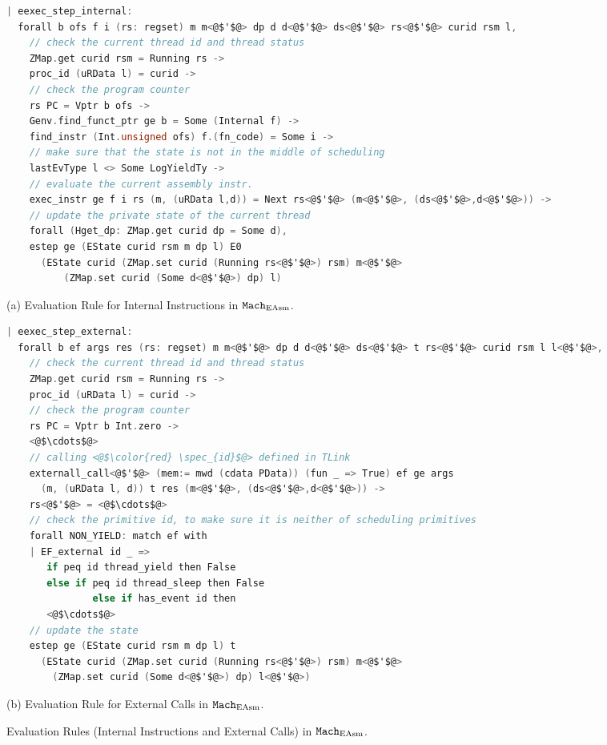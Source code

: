\begin{figure}
\begin{lstlisting}[language=C, deletekeywords={unsigned}]
| eexec_step_internal:
  forall b ofs f i (rs: regset) m m<@$'$@> dp d d<@$'$@> ds<@$'$@> rs<@$'$@> curid rsm l,
    // check the current thread id and thread status
    ZMap.get curid rsm = Running rs ->
    proc_id (uRData l) = curid ->
    // check the program counter
    rs PC = Vptr b ofs ->
    Genv.find_funct_ptr ge b = Some (Internal f) ->
    find_instr (Int.unsigned ofs) f.(fn_code) = Some i ->
    // make sure that the state is not in the middle of scheduling
    lastEvType l <> Some LogYieldTy ->
    // evaluate the current assembly instr.
    exec_instr ge f i rs (m, (uRData l,d)) = Next rs<@$'$@> (m<@$'$@>, (ds<@$'$@>,d<@$'$@>)) ->
    // update the private state of the current thread
    forall (Hget_dp: ZMap.get curid dp = Some d),
    estep ge (EState curid rsm m dp l) E0
      (EState curid (ZMap.set curid (Running rs<@$'$@>) rsm) m<@$'$@> 
          (ZMap.set curid (Some d<@$'$@>) dp) l)
\end{lstlisting}
\begin{center}
(a) Evaluation Rule for Internal Instructions in ${\mathrm{\texttt{Mach}}}_{\mathrm{EAsm}}$.
\end{center}
\begin{lstlisting}[language=C]
| eexec_step_external:
  forall b ef args res (rs: regset) m m<@$'$@> dp d d<@$'$@> ds<@$'$@> t rs<@$'$@> curid rsm l l<@$'$@>,
    // check the current thread id and thread status  
    ZMap.get curid rsm = Running rs ->
    proc_id (uRData l) = curid ->
    // check the program counter
    rs PC = Vptr b Int.zero ->
    <@$\cdots$@>
    // calling <@$\color{red} \spec_{id}$@> defined in TLink
    externall_call<@$'$@> (mem:= mwd (cdata PData)) (fun _ => True) ef ge args 
      (m, (uRData l, d)) t res (m<@$'$@>, (ds<@$'$@>,d<@$'$@>)) ->
    rs<@$'$@> = <@$\cdots$@>
    // check the primitive id, to make sure it is neither of scheduling primitives
    forall NON_YIELD: match ef with
    | EF_external id _ => 
       if peq id thread_yield then False
       else if peq id thread_sleep then False
               else if has_event id then
       <@$\cdots$@>
    // update the state
    estep ge (EState curid rsm m dp l) t 
      (EState curid (ZMap.set curid (Running rs<@$'$@>) rsm) m<@$'$@> 
        (ZMap.set curid (Some d<@$'$@>) dp) l<@$'$@>)
\end{lstlisting}
\begin{center}
(b) Evaluation Rule for External Calls in ${\mathrm{\texttt{Mach}}}_{\mathrm{EAsm}}$.
\end{center}
\caption{Evaluation Rules (Internal Instructions and External Calls) in ${\mathrm{\texttt{Mach}}}_{\mathrm{EAsm}}$.}
\label{fig:chapter:linking:eval-rule-in-easm-normal}
\end{figure}

